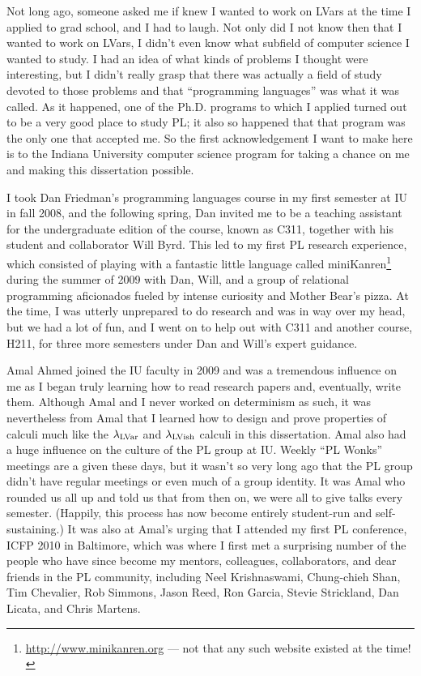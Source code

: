 Not long ago, someone asked me if knew I wanted to work on LVars at
the time I applied to grad school, and I had to laugh.  Not only did I
not know then that I wanted to work on LVars, I didn't even know what
subfield of computer science I wanted to study.  I had an idea of what
kinds of problems I thought were interesting, but I didn't really
grasp that there was actually a field of study devoted to those
problems and that ``programming languages'' was what it was called.
As it happened, one of the Ph.D. programs to which I applied turned
out to be a very good place to study PL; it also so happened that that
program was the only one that accepted me.  So the first
acknowledgement I want to make here is to the Indiana University
computer science program for taking a chance on me and making this
dissertation possible.

I took Dan Friedman's programming languages course in my first
semester at IU in fall 2008, and the following spring, Dan invited me
to be a teaching assistant for the undergraduate edition of the
course, known as C311, together with his student and collaborator Will
Byrd.  This led to my first PL research experience, which consisted of
playing with a fantastic little language called
miniKanren\footnote{\url{http://www.minikanren.org} --- not that any
such website existed at the time!} during the summer of 2009 with Dan,
Will, and a group of relational programming aficionados fueled by
intense curiosity and Mother Bear's pizza.  At the time, I was utterly
unprepared to do research and was in way over my head, but we had a
lot of fun, and I went on to help out with C311 and another course,
H211, for three more semesters under Dan and Will's expert guidance.

Amal Ahmed joined the IU faculty in 2009 and was a tremendous
influence on me as I began truly learning how to read research papers
and, eventually, write them.  Although Amal and I never worked on
determinism as such, it was nevertheless from Amal that I learned how
to design and prove properties of calculi much like the $\lambda_{\textrm{LVar}}$
and $\lambda_{\textrm{LVish}}$ calculi in this dissertation.  Amal also had a huge
influence on the culture of the PL group at IU.  Weekly ``PL Wonks''
meetings are a given these days, but it wasn't so very long ago that
the PL group didn't have regular meetings or even much of a group
identity.  It was Amal who rounded us all up and told us that from
then on, we were all to give talks every semester.  (Happily, this
process has now become entirely student-run and self-sustaining.)  It
was also at Amal's urging that I attended my first PL conference, ICFP
2010 in Baltimore, which was where I first met a surprising number of
the people who have since become my mentors, colleagues,
collaborators, and dear friends in the PL community, including Neel
Krishnaswami, Chung-chieh Shan, Tim Chevalier, Rob Simmons, Jason
Reed, Ron Garcia, Stevie Strickland, Dan Licata, and Chris Martens.


